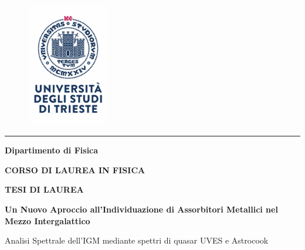 \documentclass[a4paper,12pt]{article}
\begin{document}


\thispagestyle{empty} 

\begin{center}

\begin{figure}
    \centering
    \includegraphics[height=5.44cm]{Sigillo_Centenario_HR[11385].png}
\end{figure}


\hrule

\vspace{1cm}

\LARGE{\textbf{Dipartimento di Fisica}}

\vspace{0.5cm}

\LARGE{\textbf{CORSO DI LAUREA IN FISICA}}

\vspace{0.5cm}

\LARGE{\textbf{TESI DI LAUREA}}

\vspace{.5cm}

\vspace{1.0cm}
\huge{\textbf{Un Nuovo Aproccio all'Individuazione di Assorbitori Metallici nel Mezzo Intergalattico}}

\vspace{0.3cm}

\begin{adjustwidth}{2cm}{2cm}\begin{center}
\large{Analisi Spettrale dell'IGM mediante spettri di quasar UVES e Astrocook}
\end{center}
\end{adjustwidth}

\end{center}

\vfill
\end{document}
